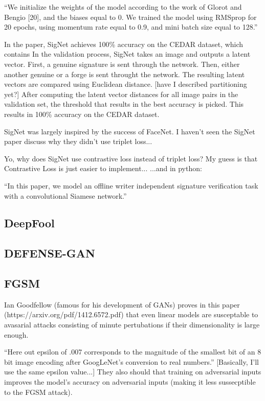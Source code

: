 ``We initialize the weights of the model according to the work
of Glorot and Bengio [20], and the biases equal to 0. We trained
the model using RMSprop for 20 epochs, using momentum rate
equal to 0.9, and mini batch size equal to 128.''

In the paper, SigNet achieves 100\% accuracy on the CEDAR dataset, which contains 
In the validation process, SigNet takes an image and outputs a latent vector.
First, a genuine signature is sent through the network.
Then, either another genuine or a forge is sent throught the network.
The resulting latent vectors are compared using Euclidean distance.
[have I described partitioning yet?]
After computing the latent vector distances for all image pairs in the validation set, the threshold that results in the best accuracy is picked.
This results in 100\% accuracy on the CEDAR dataset.

SigNet was largely inspired by the success of FaceNet.
I haven't seen the SigNet paper discuss why they didn't use triplet loss...

Yo, why does SigNet use contrastive loss instead of triplet loss?
    My guess is that Contrastive Loss is just easier to implement...
\cite{sig_net}
\cite{GitHub_sounakdey}
...and in python: \cite{GitHub_signet_pytorch}

``In this paper, we model an offline writer independent
signature verification task with a convolutional Siamese network.''\cite{sig_net}

\subsection{DeepFool}
\subsection{DEFENSE-GAN}

\subsection{FGSM}
Ian Goodfellow (famous for his development of GANs) proves in this paper (https://arxiv.org/pdf/1412.6572.pdf) that even linear models are susceptable to avasarial attacks consisting of minute pertubations if their dimensionality is large enough.

``Here out epsilon of .007 corresponds to the magnitude of the
smallest bit of an 8 bit image encoding after GoogLeNet's conversion to real numbers.''
[Basically, I'll use the same epsilon value...]
They also should that training on adversarial inputs improves the model's accuracy on adversarial inputs (making it less sussecptible to the FGSM attack).

